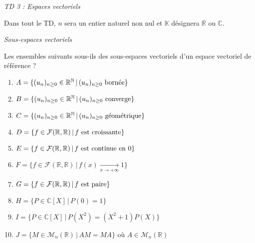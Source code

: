 \documentclass[a4paper,10pt]{report}
\begin{document}
\everymath{\displaystyle}

\everymath{\displaystyle}
\begin{center}
\textit{{ {\huge TD 3 : Espaces vectoriels}}}
\end{center}
\bigskip


\noindent Dans tout le TD, $n$ sera un entier naturel non nul et $\mathbb{K}$ désignera $\mathbb{R}$ ou $\mathbb{C}$.

\medskip

\begin{center}
\textit{{ {\large Sous-espaces vectoriels}}}
\end{center}

\begin{Exercice}{} Les ensembles suivants sous-ils des sous-espaces vectoriels d'un espace vectoriel de référence ?

\begin{multicols}{2}
\begin{small}
\begin{enumerate}
\item $A = \lbrace (u_n)_{n \geq 0} \in \mathbb{R}^{\mathbb{N}} \, \vert \, (u_n)_{n \geq 0} \hbox{ bornée} \rbrace $
\item $B = \lbrace (u_n)_{n \geq 0} \in \mathbb{R}^{\mathbb{N}} \, \vert \, (u_n)_{n \geq 0} \hbox{ converge} \rbrace $
\item $C = \lbrace (u_n)_{n \geq 0} \in \mathbb{R}^{\mathbb{N}} \, \vert \, (u_n)_{n \geq 0} \hbox{ géométrique} \rbrace $
\item $D = \lbrace f \in \mathcal{F}(\mathbb{R}, \mathbb{R}) \, \vert \, f \hbox{ est croissante} \rbrace$
\item $E = \lbrace f \in \mathcal{F}(\mathbb{R}, \mathbb{R}) \, \vert \, f \hbox{ est continue en 0} \rbrace$
\columnbreak
\item $F = \lbrace f \in \mathcal{F}(\mathbb{R}, \mathbb{R}) \, \vert \, f(x) \underset{ x \rightarrow + \infty}{\rightarrow} 1 \rbrace$
\item $G= \lbrace f \in \mathcal{F}(\mathbb{R}, \mathbb{R}) \, \vert \, f \hbox{ est paire} \rbrace$
\item $H= \lbrace P \in \mathbb{C}[X] \, \vert \, P(0)=1  \rbrace$
\item $I= \lbrace P \in \mathbb{C}[X] \, \vert \, P(X^2)=(X^2+1)P(X)  \rbrace$
\item $J= \lbrace M \in \mathcal{M}_n(\mathbb{R}) \, \vert \, AM=MA \rbrace$ où $A \in \mathcal{M}_n(\mathbb{R})$
\end{enumerate}
\end{small}
\end{multicols}
\vspace{0.01cm}
\end{Exercice}
\end{document}
